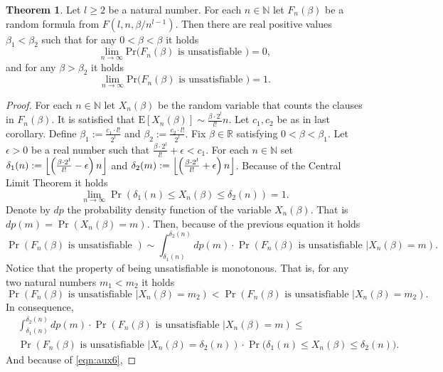 \documentclass[12pt,notitlepage,a4paper]{article}
\theoremstyle{definition}
\newtheorem{theorem}{Theorem}[section]
\newcommand{\R}{\mathbb{R}}
\newcommand{\N}{\mathbb{N}}
\newcommand{\Ln}{\lim\limits_{n\to \infty}}
\newcommand{\PR}[1]{\mathrm{Pr}\big(#1\big)}
\DeclarePairedDelimiter\floor{\lfloor}{\rfloor}
\begin{document}
\begin{theorem} \label{thm:phasetransition}
	Let $l\geq 2$ be a natural number.
	For each $n\in \N$ let $F_n(\beta)$ be a random formula from
	$F(l,n,\beta/n^{l-1})$. Then there are real positive values 
	$\beta_1 < \beta_2$ such that for any $0<\beta<\beta$
	it holds
	\[
	\Ln \PR{F_n(\beta) \text{ is unsatisfiable }  }=0,
	\]
	and for any $\beta>\beta_2$
	it holds
	\[
	\Ln \PR{F_n(\beta) \text{ is unsatisfiable }  }=1.
	\]
\end{theorem}
\begin{proof}
	For each $n\in \N$ let $X_{n}(\beta)$ be the random variable
	that counts the clauses in $F_n(\beta)$. It is satisfied that
	$\mathrm{E}[X_n(\beta)]\sim \frac{\beta\cdot 2^l}{l!}n$. Let $c_1,
	c_2$ be as in last corollary. Define $\beta_1:= \frac{c_1\cdot l!}{2^l}$
	and $\beta_2:= \frac{c_2 \cdot l!}{2^l}$. Fix $\beta\in \R$ satisfying
	$0<\beta<\beta_1$. Let $\epsilon>0$ be a real number such that
	$ \frac{\beta\cdot 2^l}{l!} +\epsilon< c_1$. For each $n\in \N$
	set $\delta_1(n):=\floor*{ \left(\frac{\beta\cdot 2^l}{l!}-\epsilon\right)n}$
	and $\delta_2(m):=\floor*{ \left(\frac{\beta\cdot 2^l}{l!}+\epsilon\right)n}$.
	Because of the Central Limit
	Theorem it holds
	\begin{equation}\label{eqn:aux6}
	\Ln \Pr\left( \delta_1(n) \leq X_n(\beta)  
	\leq \delta_2(n)    \right) = 1.
	\end{equation}
	Denote by $dp$ the probability density function of the variable $X_n(\beta)$.
	That is $dp(m)=\Pr(X_n(\beta)=m)$. Then, because of the previous equation it holds
	\[
	\Pr\left( F_n(\beta) \text{ is unsatisfiable }\right)\sim
	\int_{\delta_1(n)}^{\delta_2(n)}
	dp(m) \cdot \Pr \left(
	F_n(\beta) \text{ is unsatisfiable } \Big|
	X_n(\beta)=m	
	\right).
	\]
	Notice that the property of being unsatisfiable is monotonous. That is,
	for any two natural numbers $m_1<m_2$ it holds
	\[
	 \Pr \left(
	F_n(\beta) \text{ is unsatisfiable } \Big|
	X_n(\beta)=m_2	
	\right) <  \Pr \left(
	F_n(\beta) \text{ is unsatisfiable } \Big|
	X_n(\beta)=m_2	
	\right).
	\]
	In consequence,
	\begin{align*}
	&\int_{\delta_1(n)}^{\delta_2(n)}
	dp(m) \cdot \Pr \left(
	F_n(\beta) \text{ is unsatisfiable } \Big|
	X_n(\beta)=m	
	\right)\leq \\ & 
	\Pr \left(
	F_n(\beta) \text{ is unsatisfiable } \Big|
	X_n(\beta)=\delta_2(n) \right) \cdot 
	\Pr\big( \delta_1(n) \leq X_n(\beta)  
	\leq \delta_2(n)  \big).   
	\end{align*}
	And because of \cref{eqn:aux6}, 

\end{proof}
\end{document}
